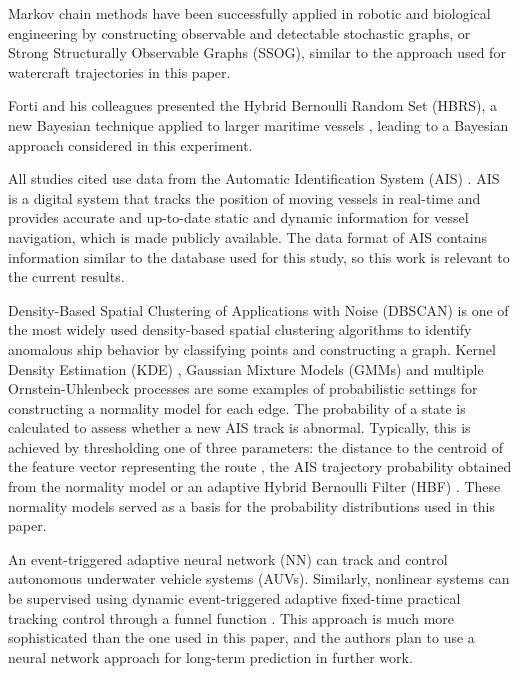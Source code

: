 \documentclass[preprint,12pt]{elsarticle}
\begin{document}
Markov chain methods have been successfully applied in robotic \cite{10130587} and biological engineering \cite{10106394, 10309224} by constructing observable and detectable stochastic graphs, or Strong Structurally Observable Graphs (SSOG), similar to the approach used for watercraft trajectories in this paper.

Forti and his colleagues presented the Hybrid Bernoulli Random Set (HBRS), a new Bayesian technique applied to larger maritime vessels \citep{2018Forti, 2019Forti, 2020FortiO, 2022Forti2, 2022FortiO, 2022Forti1}, leading to a Bayesian approach considered in this experiment.

All studies cited use data from the Automatic Identification System (AIS) \citep{2016Ning}. AIS is a digital system that tracks the position of moving vessels in real-time and provides accurate and up-to-date static and dynamic information for vessel navigation, which is made publicly available. The data format of AIS contains information similar to the database used for this study, so this work is relevant to the current results.

Density-Based Spatial Clustering of Applications with Noise (DBSCAN) \citep{Ester1996ADA} is one of the most widely used density-based spatial clustering algorithms to identify anomalous ship behavior \citep{2018Coscia, 2018dAfflisio1, 2016Millefiori, Khan2004RealtimePO, 2021Pedroche} by classifying points and constructing a graph. Kernel Density Estimation (KDE) \citep{2013Pallotta, 2020Loi}, Gaussian Mixture Models (GMMs) \citep{2008Laxhammar} and multiple Ornstein-Uhlenbeck processes \citep{2019Forti, 2018Coscia1, 2014Pallotta} are some examples of probabilistic settings for constructing a normality model for each edge. The probability of a state is calculated to assess whether a new AIS track is abnormal. Typically, this is achieved by thresholding one of three parameters: the distance to the centroid of the feature vector representing the route \citep{Varlamis2019ANA}, the AIS trajectory probability obtained from the normality model \citep{2013Pallotta} or an adaptive Hybrid Bernoulli Filter (HBF) \citep{2019Forti}. These normality models served as a basis for the probability distributions used in this paper.

An event-triggered adaptive neural network (NN) \cite{10681283} can track and control autonomous underwater vehicle systems (AUVs). Similarly, nonlinear systems can be supervised using dynamic event-triggered adaptive fixed-time practical tracking control through a funnel function \cite{10681502}. This approach is much more sophisticated than the one used in this paper, and the authors plan to use a neural network approach for long-term prediction in further work.
\end{document}
